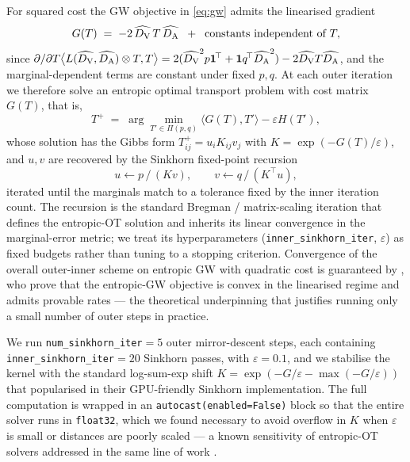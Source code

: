 For squared cost the GW objective in \eqref{eq:gw} admits the
linearised gradient
\begin{equation}
  G(T) \;=\; -2\, \widehat{D_{\mathrm{V}}} \, T \, \widehat{D_{\mathrm{A}}}
  \;\;+\;\; \text{constants independent of } T,
  \label{eq:gw_gradient}
\end{equation}
since
$\partial / \partial T \bigl\langle L(\widehat{D_{\mathrm{V}}}, \widehat{D_{\mathrm{A}}})
\otimes T, T\bigr\rangle = 2 (\widehat{D_{\mathrm{V}}}^{2} p \mathbf{1}^{\!\top}
+ \mathbf{1} q^{\!\top} \widehat{D_{\mathrm{A}}}^{2}) - 2 \widehat{D_{\mathrm{V}}} T
\widehat{D_{\mathrm{A}}}$, and the marginal-dependent terms are constant under
fixed $p, q$. At each outer iteration we therefore solve an
entropic optimal transport problem with cost matrix $G(T)$, that is,
\begin{equation}
  T^{+}
  \;=\;
  \arg\min_{T' \in \Pi(p,q)}
  \langle G(T), T'\rangle - \varepsilon H(T'),
  \label{eq:inner_eot}
\end{equation}
whose solution has the Gibbs form $T^{+}_{ij} = u_i K_{ij} v_j$
with $K = \exp(-G(T)/\varepsilon)$, and $u, v$ are recovered by the
Sinkhorn fixed-point recursion
\begin{equation}
  u \leftarrow p \,/\, (K v),
  \qquad
  v \leftarrow q \,/\, (K^{\!\top} u),
  \label{eq:sinkhorn}
\end{equation}
iterated until the marginals match to a tolerance fixed by the
inner iteration count. The recursion is the standard Bregman /
matrix-scaling iteration that defines the entropic-OT solution
and inherits its linear convergence in the marginal-error
metric; we treat its hyperparameters
(\texttt{inner\_sinkhorn\_iter}, $\varepsilon$) as fixed budgets
rather than tuning to a stopping criterion. Convergence of the
overall outer-inner scheme on entropic GW with quadratic cost is
guaranteed by \citet{rioux_2023_entropic}, who prove
that the entropic-GW objective is convex in the linearised
regime and admits provable rates --- the theoretical underpinning
that justifies running only a small number of outer steps in
practice.

We run \texttt{num\_sinkhorn\_iter}$=5$ outer mirror-descent
steps, each containing \texttt{inner\_sinkhorn\_iter}$=20$
Sinkhorn passes, with $\varepsilon = 0.1$, and we stabilise the
kernel with the standard log-sum-exp shift
$K = \exp(-G/\varepsilon - \max(-G/\varepsilon))$ that
\citet{feydy_2019_interpolating} popularised in their
GPU-friendly Sinkhorn implementation. The full computation is
wrapped in an \texttt{autocast(enabled=False)} block so that the
entire solver runs in \texttt{float32}, which we found necessary
to avoid overflow in $K$ when $\varepsilon$ is small or distances
are poorly scaled --- a known sensitivity of entropic-OT solvers
addressed in the same line of work
\citep{feydy_2019_interpolating, rioux_2023_entropic}.

